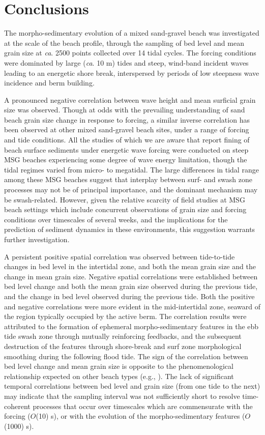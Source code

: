 \documentclass[jmse,article,submit,pdftex,moreauthors]{Definitions/mdpi}
\begin{document}
\section{Conclusions}\label{Conclusions}

The morpho-sedimentary evolution of a mixed sand-gravel beach was investigated at the scale of the beach profile, through the sampling of bed level and mean grain size at \textit{ca}. 2500 points collected over 14 tidal cycles. The forcing conditions were dominated by large (\textit{ca}. 10 m) tides and steep, wind-band incident waves leading to an energetic shore break, interspersed by periods of low steepness wave incidence and berm building. 

A pronounced negative correlation between wave height and mean surficial grain size was observed. Though at odds with the prevailing understanding of sand beach grain size change in response to forcing, a similar inverse correlation has been observed at other mixed sand-gravel beach sites, under a range of forcing and tide conditions. All the studies of which we are aware that report fining of beach surface sediments under energetic wave forcing were conducted on steep MSG beaches experiencing some degree of wave energy limitation, though the tidal regimes varied from micro- to megatidal. The large differences in tidal range among these MSG beaches suggest that interplay between surf- and swash zone processes may not be of principal importance, and the dominant mechanism may be swash-related. However, given the relative scarcity of field studies at MSG beach settings which include concurrent observations of grain size and forcing conditions over timescales of several weeks, and the implications for the prediction of sediment dynamics in these environments, this suggestion warrants further investigation. 

A persistent positive spatial correlation was observed between tide-to-tide changes in bed level in the intertidal zone, and both the mean grain size and the change in mean grain size. Negative spatial correlations were established between bed level change and both the mean grain size observed during the previous tide, and the change in bed level observed during the previous tide. Both the positive and negative correlations were more evident in the mid-intertidal zone, seaward of the region typically occupied by the active berm. The correlation results were attributed to the formation of ephemeral morpho-sedimentary features in the ebb tide swash zone through mutually reinforcing feedbacks, and the subsequent destruction of the features through shore-break and surf zone morphological smoothing during the following flood tide. The sign of the correlation between bed level change and mean grain size is opposite to the phenomenological relationship expected on other beach types (e.g., \citep{Masselink_etal2007}). The lack of significant temporal correlations between bed level and grain size (from one tide to the next) may indicate that the sampling interval was not sufficiently short to resolve time-coherent processes that occur over timescales which are commensurate with the forcing ($O$(10) s), or with the evolution of the morpho-sedimentary features ($O$(1000) s).
\end{document}
